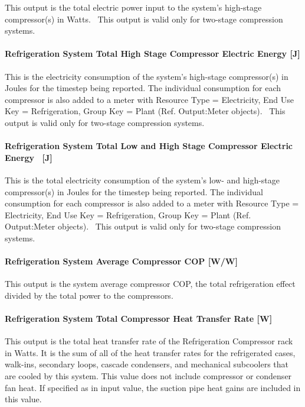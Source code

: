 This output is the total electric power input to the system's high-stage compressor(s) in Watts.~ This output is valid only for two-stage compression systems.

\paragraph{Refrigeration System Total High Stage Compressor Electric Energy {[}J{]}}\label{refrigeration-system-total-high-stage-compressor-electric-energy-j}

This is the electricity consumption of the system's high-stage compressor(s) in Joules for the timestep being reported. The individual consumption for each compressor is also added to a meter with Resource Type = Electricity, End Use Key = Refrigeration, Group Key = Plant (Ref. Output:Meter objects).~ This output is valid only for two-stage compression systems.

\paragraph{Refrigeration System Total Low and High Stage Compressor Electric Energy~ {[}J{]}}\label{refrigeration-system-total-low-and-high-stage-compressor-electric-energy-j}

This is the total electricity consumption of the system's low- and high-stage compressor(s) in Joules for the timestep being reported. The individual consumption for each compressor is also added to a meter with Resource Type = Electricity, End Use Key = Refrigeration, Group Key = Plant (Ref. Output:Meter objects).~ This output is valid only for two-stage compression systems.

\paragraph{Refrigeration System Average Compressor COP {[}W/W{]}}\label{refrigeration-system-average-compressor-cop-ww}

This output is the system average compressor COP, the total refrigeration effect divided by the total power to the compressors.

\paragraph{Refrigeration System Total Compressor Heat Transfer Rate {[}W{]}}\label{refrigeration-system-total-compressor-heat-transfer-rate-w}

This output is the total heat transfer rate of the Refrigeration Compressor rack in Watts. It is the sum of all of the heat transfer rates for the refrigerated cases, walk-ins, secondary loops, cascade condensers, and mechanical subcoolers that are cooled by this system. This value does not include compressor or condenser fan heat. If specified as in input value, the suction pipe heat gains are included in this value.

